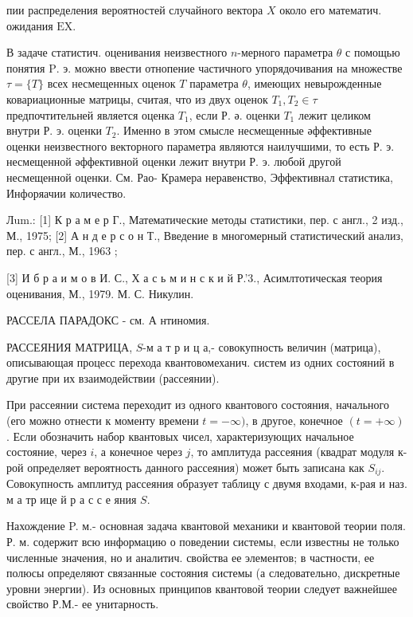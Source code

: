 \documentclass[10pt]{article}
\begin{document}
пии распределения вероятностей случайного вектора $X$ около его математич. ожидания $\mathrm{EX}$.



В задаче статистич. оценивания неизвестного $n$-мерного параметра $\theta$ с помощью понятия $\mathrm{P}$. э. можно ввести отнопение частичного упорядочивания на множестве $\tau=\{T\}$ всех несмещенных оценок $T$ параметра $\theta$, имеющих невырожденные ковариационные матрицы, считая, что из двух оценок $T_{1}, T_{2} \in \tau$ предпочтительней является оценка $T_{1}$, если Р. ә. оценки $T_{1}$ лежит целиком внутри Р. э. оценки $T_{2}$. Именно в этом смысле несмещенные әффективные оценки неизвестного векторного параметра являются наилучшими, то есть Р. э. несмещенной әффективной оценки лежит внутри Р. э. любой другой несмещенной оценки. См. Рао- Крамера неравенство, Эффективнал статистика, Инфоряачии количество.



Лum.: [1] К р а м е р Г., Математические методы статистики, пер. с англ., 2 изд., М., 1975; [2] А н д е р с о н Т., Введение в многомерный статистический анализ, пер. с англ., М., 1963 ;

[3] И б р а и м о в И. С., Х а с ь м и н с к и й Р.'3., Асимлтотическая теория оценивания, М., 1979. М. С. Никулин.



РАССЕЛА ПАРАДОКС - см. А нтиномия.



РАССЕЯНИЯ МАТРИЦА, $S$-м а т р и ц а,- совокупность величин (матрица), описывающая процесс перехода квантовомеханич. систем из одних состояний в другие при их взаимодействии (рассеянии).



При рассеянии система переходит из одного квантового состояния, начального (его можно отнести к моменту времени $t=-\infty)$, в другое, конечное $(t=+\infty)$. Если обозначить набор квантовых чисел, характеризующих начальное состояние, через $i$, а конечное через $j$, то амплитуда рассеяния (квадрат модуля к-рой определяет вероятность данного рассеяния) может быть записана как $S_{i j}$. Совокупность амплитуд рассеяния образует таблицу с двумя входами, к-рая и наз. м а тр ице й р а с с е яния $S$.



Нахождение P. м.- основная задача квантовой механики и квантовой теории поля. Р. м. содержит всю информацию о поведении системы, если известны не только численные значения, но и аналитич. свойства ее элементов; в частности, ее полюсы определяют связанные состояния системы (а следовательно, дискретные уровни энергии). Из основных принципов квантовой теории следует важнейшее свойство Р.М.- ее унитарность.
\end{document}
